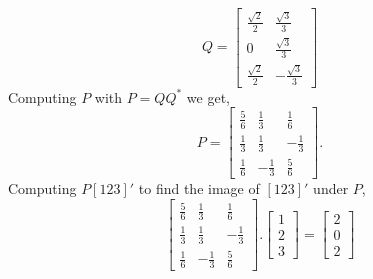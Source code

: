 \documentclass[12pt]{article}
\makeatletter
\theoremstyle{homework}
\newenvironment{exercise}[1]
{\def\@currentlabel{#1}\exercisecore}
{\endexercisecore}
\makeatother
\begin{document}
\begin{exercise}{6.4}
\begin{enumerate}
    \begin{equation*}
      Q = 
      \begin{bmatrix}
        \frac{\sqrt{2}}{2} & \frac{\sqrt{3}}{3}\\
        0 & \frac{\sqrt{3}}{3}\\
        \frac{\sqrt{2}}{2} & -\frac{\sqrt{3}}{3}
      \end{bmatrix}
    \end{equation*}
    Computing $P$ with $P = QQ^*$ we get, 
    \begin{equation*}
      P = \begin{bmatrix}\frac{5}{6}&\frac{1}{3}&\frac{1}{6}\\ \frac{1}{3}&\frac{1}{3}&-\frac{1}{3}\\ \frac{1}{6}&-\frac{1}{3}&\frac{5}{6}\end{bmatrix}.
    \end{equation*}
    Computing $P[1 2 3]'$ to find the image of $[1 2 3]'$ under $P$, 
    \begin{equation*}
      \begin{bmatrix}\frac{5}{6}&\frac{1}{3}&\frac{1}{6}\\ \frac{1}{3}&\frac{1}{3}&-\frac{1}{3}\\ \frac{1}{6}&-\frac{1}{3}&\frac{5}{6}\end{bmatrix}.
      \begin{bmatrix}
        1\\
        2\\
        3
      \end{bmatrix} = 
      \begin{bmatrix}2\\ 0\\ 2\end{bmatrix}
    \end{equation*}
  \end{enumerate}
\end{exercise}
\vspace{1in}
\end{document}
